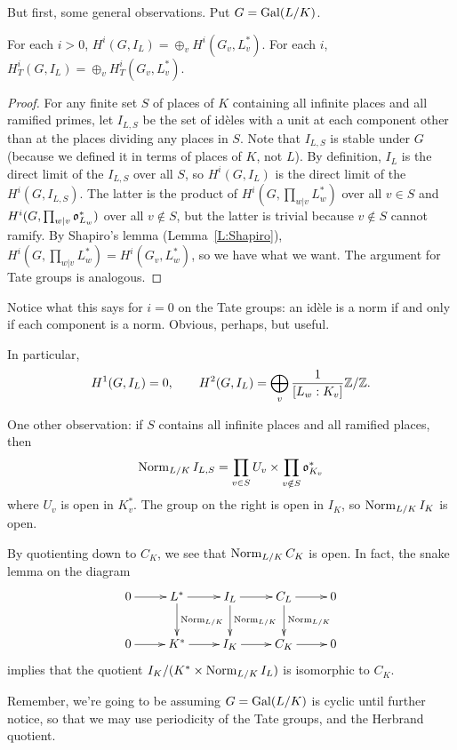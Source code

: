 But first, some general observations. Put $G = \operatorname{Gal}(L/K)$.
\begin{prop}
  For each $i>0$, $H^i(G, I_L) = \oplus_v H^i(G_v, L_v^*)$. For each
$i$, $H^i_T(G, I_L) = \oplus_v H^i_T(G_v, L_v^*)$.
\end{prop}
\begin{proof}
For any finite set $S$ of places of $K$ containing all infinite places
and all ramified primes, let $I_{L,S}$ be the set of id\`eles
with a unit at each component other than at the places dividing 
any places in $S$. Note that $I_{L,S}$ is stable under $G$ (because we
defined it in terms of places of $K$, not $L$). By definition,
$I_L$ is the direct limit of the $I_{L,S}$ over all $S$, so $H^i(G,I_L)$
is the direct limit of the $H^i(G, I_{L,S})$. The latter is the product of
$H^i(G, \prod_{w|v} L_w^*)$ over all $v \in S$ and 
$H^i(G, \prod_{w|v} \mathfrak{o}_{L_w}^*)$ over all $v \notin S$, but the latter
is trivial because $v \notin S$ cannot ramify. By Shapiro's lemma (Lemma~\ref{L:Shapiro}),
$H^i(G, \prod_{w|v} L_w^*) = H^i(G_v, L_w^*)$, so we have what we want.
The argument for Tate groups is analogous.
\end{proof}
Notice what this says for $i=0$ on the Tate groups: an id\`ele is a norm
if and only if each component is a norm. Obvious, perhaps, but useful.

In particular,
\[
H^1(G, I_L) = 0, \qquad H^2(G, I_L) = \bigoplus_v \frac{1}{[L_w:K_v]} \mathbb{Z}/\mathbb{Z}.
\]

One other observation: if $S$ contains all 
infinite places and all ramified places, then
\[
\operatorname{Norm}_{L/K} I_{L,S} = \prod_{v \in S} U_v \times \prod_{v \notin S} \mathfrak{o}_{K_v}^*
\]
where $U_v$ is open in $K_v^*$. The group on the right is open in $I_K$, so
$\operatorname{Norm}_{L/K} I_K$ is open.

By quotienting down to $C_K$, we see that $\operatorname{Norm}_{L/K} C_K$ is open. In fact,
the snake lemma on the diagram
\[
\xymatrix{
0 \ar[r] & L^* \ar[r] \ar^{\Norm_{L/K}}[d] & I_L \ar[r] \ar^{\Norm_{L/K}}[d]
& C_L \ar[r] \ar^{\Norm_{L/K}}[d] & 0 \\
0 \ar[r] & K^* \ar[r] & I_K \ar[r] & C_K \ar[r] & 0
}
\]
implies that the quotient $I_K/(K^* \times \operatorname{Norm}_{L/K} I_L)$ is isomorphic
to $C_K$.


Remember, we're going to be assuming $G = \operatorname{Gal}(L/K)$ is cyclic until further notice,
so that we may use periodicity of the Tate groups, and the Herbrand quotient.

